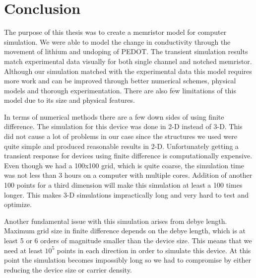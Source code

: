 
\chapter{Conclusion} %

\label{Chapter7} %


\begin{doublespace}


The purpose of this thesis was to create a memristor model for computer simulation. We were able to model the change in conductivity through the movement of lithium and undoping of PEDOT. The transient simulation results match experimental data visually for both single channel and notched memristor. Although our simulation matched with the experimental data this model requires more work and can be improved through better numerical schemes, physical models and thorough experimentation. There are also few limitations of this model due to its size and physical features.

In terms of numerical methods there are a few down sides of using finite difference. The simulation for this device was done in 2-D instead of 3-D. This did not cause a lot of problems in our case since the structures we used were quite simple and produced reasonable results in 2-D. Unfortunately getting a transient response for devices using finite difference is computationally expensive. Even though we had a 100x100 grid, which is quite coarse, the simulation time was not less than 3 hours on a computer with multiple cores. Addition of another 100 points for a third dimension will make this simulation at least a 100 times longer. This makes 3-D simulations impractically long and very hard to test and optimize.

Another fundamental issue with this simulation arises from debye length. Maximum grid size in finite difference depends on the debye length, which is at least 5 or 6 orders of magnitude smaller than the device size. This means that we need at least $10^5$ points in each direction in order to simulate this device. At this point the simulation becomes impossibly long so we had to compromise by either reducing the device size or carrier density.     


\end{doublespace}
